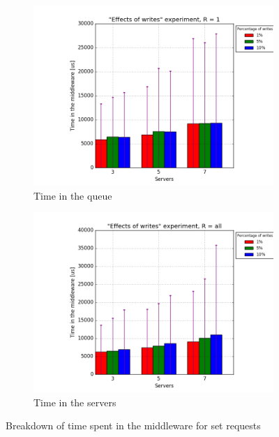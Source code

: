 \documentclass[11pt]{article}
\begin{document}
\begin{figure}
\centering
\begin{subfigure}{.5\textwidth}
	\centering
	\includegraphics[width=\linewidth]{plots/writes-all-1-replication}
	\caption{Time in the queue}
	\label{fig:writes-all-1-replication}
\end{subfigure}%
\begin{subfigure}{.5\textwidth}
	\centering
	\includegraphics[width=\linewidth]{plots/writes-all-2-replication}
	\caption{Time in the servers}
	\label{fig:writes-all-2-replication}
\end{subfigure}
\caption{Breakdown of time spent in the middleware for set requests}
\end{figure}

 
\end{document}
